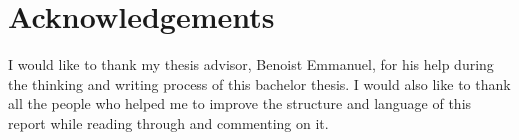 \chapter*{Acknowledgements}
\thispagestyle{empty}

I would like to thank my thesis advisor, Benoist Emmanuel, for his help during the thinking and writing process of this bachelor thesis.
I would also like to thank all the people who helped me to improve the structure and language of this report while reading through and commenting on it.

\clearpage